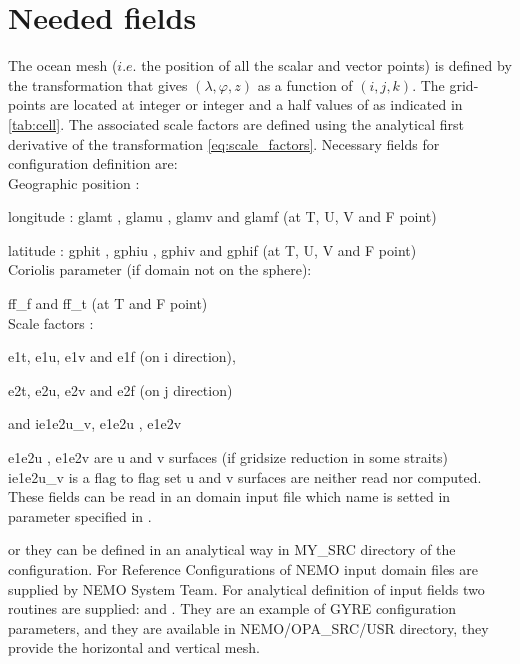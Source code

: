 \documentclass[../tex_main/NEMO_manual]{subfiles}
\begin{document}
\section{Needed fields}
\label{sec:DOM_fields}
The ocean mesh ($i.e.$ the position of all the scalar and vector points) is defined 
by the transformation that gives $(\lambda,\varphi,z)$ as a function of $(i,j,k)$. 
The grid-points are located at integer or integer and a half values of as indicated 
in \autoref{tab:cell}. The associated scale factors are defined using the  
analytical first derivative of the transformation \autoref{eq:scale_factors}. 
Necessary fields for configuration definition are: \\
Geographic position :

longitude : glamt , glamu , glamv and glamf  (at T, U, V and F point)

latitude : gphit , gphiu , gphiv and gphif (at T, U, V and F point)\\
Coriolis parameter (if domain not on the sphere): 

 ff\_f  and  ff\_t (at T and F point)\\
Scale factors : 
 
 e1t, e1u, e1v and e1f (on i direction),

 e2t, e2u, e2v and e2f (on j direction)

 and ie1e2u\_v, e1e2u , e1e2v   
 
e1e2u , e1e2v are u and v surfaces (if gridsize reduction in some straits)\\
ie1e2u\_v is a flag to flag set u and  v surfaces are neither read nor computed.\\
 
These fields can be read in an domain input file which name is setted in  parameter specified in .

or they can be defined in an analytical way in MY\_SRC directory of the configuration.
For Reference Configurations of NEMO input domain files are supplied by NEMO System Team. For analytical definition of input fields two routines are supplied:  and . They are an example of GYRE configuration parameters, and they are available in NEMO/OPA\_SRC/USR directory, they provide the horizontal and vertical mesh. 
\end{document}
